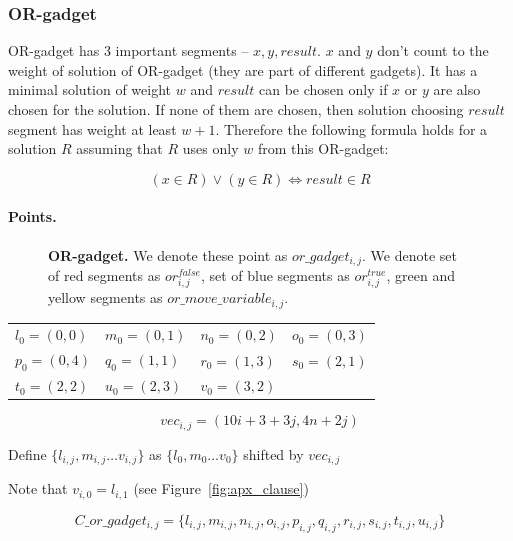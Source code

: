 \subsubsection{OR-gadget}

OR-gadget has 3 important segments
-- $x, y, result$. $x$ and $y$ don't count to the weight of solution
of OR-gadget (they are part of different gadgets).
It has a minimal solution of weight $w$
and $result$ can be chosen only if $x$ or $y$ are also chosen
for the solution.
If none of them are chosen, then solution
choosing $result$ segment has weight at least $w+1$.
Therefore the following formula holds for a solution $R$
assuming that $R$ uses only $w$ from this OR-gadget:

$$ (x \in R) \lor (y \in R) \iff result \in R  $$

\paragraph{Points.}

\begin{figure}[h]
\centering
\def\svgwidth{0.5\columnwidth}

\caption{
\textbf{OR-gadget.} We denote these point as $or\_gadget_{i, j}$. 
We denote set of red segments as $or^{false}_{i, j}$,
set of blue segments as $or^{true}_{i, j}$,
green and yellow segments as $or\_move\_variable_{i, j}$.
}
\label{fig:apx_or_gadget}
\end{figure}

	\begin{center}
\begin{tabular}{ l l l l}

	$l_0 = (0, 0)$ &
	$m_0 = (0, 1)$ &
	$n_0 = (0, 2)$ &
	$o_0 = (0, 3)$ \\
	$p_0 = (0, 4)$ &
	$q_0 = (1, 1)$ &
	$r_0 = (1, 3)$ &
	$s_0 = (2, 1)$ \\
	$t_0 = (2, 2)$ &
	$u_0 = (2, 3)$ &
	$v_0 = (3, 2)$ &
\end{tabular}
\end{center}


	$$vec_{i, j} = (10i + 3 + 3j, 4n + 2j)$$
	
	Define 
	$\{ l_{i, j}, m_{i, j} \ldots v_{i, j} \}$
	as $\{l_0, m_0 \ldots v_0\}$ shifted by $vec_{i, j}$

Note that $v_{i, 0} = l_{i, 1}$ (see Figure~\ref{fig:apx_clause})
 
  $$C\_or\_gadget_{i, j} = 
 \{l_{i, j}, m_{i, j}, n_{i, j}, o_{i, j},
 p_{i, j}, q_{i, j}, r_{i, j}, s_{i, j}, t_{i, j}, u_{i, j} \}
 $$
 
